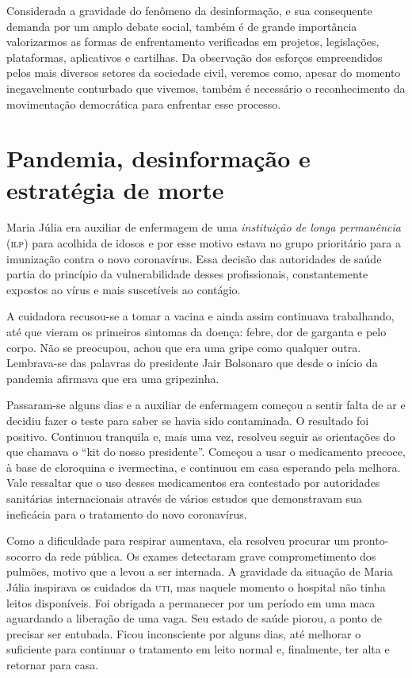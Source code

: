 Considerada a gravidade do fenômeno da desinformação,
e sua consequente demanda por um amplo debate social, também é de grande importância 
valorizarmos as formas de enfrentamento verificadas em projetos, legislações,
plataformas, aplicativos e cartilhas. Da observação dos esforços
empreendidos pelos mais diversos setores da sociedade civil, veremos
como, apesar do momento inegavelmente conturbado que vivemos, também é
necessário o reconhecimento da movimentação democrática para enfrentar esse
processo.


\chapter{Pandemia, desinformação e\\estratégia de morte}

Maria Júlia era auxiliar de enfermagem de uma \textit{instituição de longa
permanência} (\textsc{ilp}) para acolhida de idosos e por esse motivo estava no
grupo prioritário para a imunização contra o novo coronavírus. Essa
decisão das autoridades de saúde partia do princípio da vulnerabilidade
desses profissionais, constantemente expostos ao vírus e mais
suscetíveis ao contágio.

A cuidadora recusou-se a tomar a vacina e ainda assim continuava
trabalhando, até que vieram os primeiros sintomas da doença:
febre, dor de garganta e pelo corpo. Não se preocupou,
achou que era uma gripe como qualquer outra. Lembrava-se das palavras do
presidente Jair Bolsonaro que desde o início da pandemia afirmava que
era uma gripezinha.

Passaram-se alguns dias e a auxiliar de enfermagem começou a sentir
falta de ar e decidiu fazer o teste para saber se havia sido
contaminada. O resultado foi positivo. Continuou tranquila e, mais uma
vez, resolveu seguir as orientações do que chamava o ``kit do nosso
presidente''. Começou a usar o medicamento precoce, à base de cloroquina
e ivermectina, e continuou em casa esperando pela melhora. Vale
ressaltar que o uso desses medicamentos era contestado por autoridades
sanitárias internacionais através de vários estudos que demonstravam sua
ineficácia para o tratamento do novo coronavírus.

Como a dificuldade para respirar aumentava, ela resolveu procurar um
pronto-socorro da rede pública. Os exames detectaram grave
comprometimento dos pulmões, motivo que a levou a ser internada. A
gravidade da situação de Maria Júlia inspirava os cuidados da \textsc{uti}, mas naquele momento o hospital não tinha leitos
disponíveis. Foi obrigada a permanecer por um período em uma maca
aguardando a liberação de uma vaga. Seu estado de saúde piorou, a ponto
de precisar ser entubada. Ficou inconsciente por alguns dias, até
melhorar o suficiente para continuar o tratamento em leito normal e,
finalmente, ter alta e retornar para casa.


